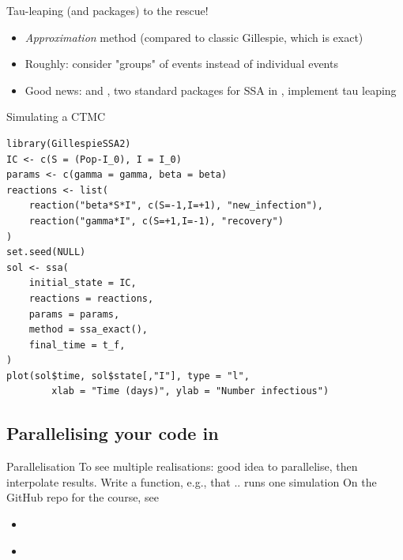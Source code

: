 \documentclass[aspectratio=169]{beamer}
\begin{document}
\begin{frame}{Tau-leaping (and packages) to the rescue!}
    \begin{itemize}
        \item \emph{Approximation} method (compared to classic Gillespie, which is exact)
        \item Roughly: consider "groups" of events instead of individual events
        \item Good news:  and , two standard packages for SSA in , implement tau leaping
    \end{itemize}
\end{frame}


\begin{frame}[fragile]{Simulating a CTMC}
\begin{lstlisting}[language=Renhanced]
library(GillespieSSA2)
IC <- c(S = (Pop-I_0), I = I_0)
params <- c(gamma = gamma, beta = beta)
reactions <- list(
    reaction("beta*S*I", c(S=-1,I=+1), "new_infection"),
    reaction("gamma*I", c(S=+1,I=-1), "recovery")
)
set.seed(NULL)
sol <- ssa(
    initial_state = IC,
    reactions = reactions,
    params = params,
    method = ssa_exact(),
    final_time = t_f,
)
plot(sol$time, sol$state[,"I"], type = "l",
        xlab = "Time (days)", ylab = "Number infectious")    
\end{lstlisting}
\end{frame}


\subsection{Parallelising your code in }

\begin{frame}{Parallelisation}
    To see multiple realisations: good idea to parallelise, then interpolate results. Write a function, e.g.,   that .. runs one simulation
    \vfill
    On the GitHub repo for the course, see
    \begin{itemize}
        \item \href{https://raw.githubusercontent.com/julien-arino/3MC-mathematical-modelling-in-biology/main/CODE/Julien/SIS_CTMC_parallel.R}{}
        \item \href{https://raw.githubusercontent.com/julien-arino/3MC-mathematical-modelling-in-biology/main/CODE/Julien/SIS_CTMC_parallel_multiple_R0.R}{}
    \end{itemize}
\end{frame}
\end{document}
